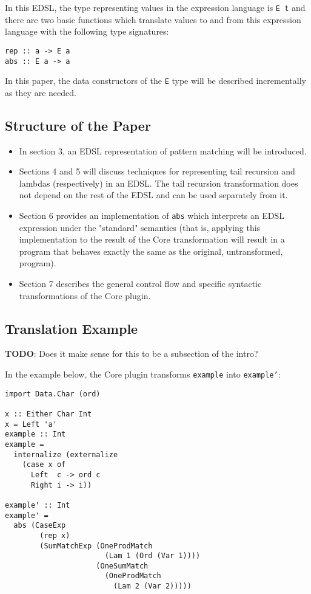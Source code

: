 \documentclass[sigplan,screen]{acmart}
\newcommand{\ttt}{\texttt}
\begin{document}
In this EDSL, the type representing values in the expression language is \ttt{E t}
and there are two basic functions which translate values to and from this
expression language with the following type signatures:

\begin{lstlisting}
rep :: a -> E a
abs :: E a -> a
\end{lstlisting}

In this paper, the data constructors of the \ttt{E} type will be described
incrementally as they are needed.

\subsection{Structure of the Paper}

\begin{itemize}
  \item In section 3, an EDSL representation of pattern matching will be
    introduced.
  \item Sections 4 and 5 will discuss techniques for representing tail recursion
    and lambdas (respectively) in an EDSL. The tail recursion transformation
    does not depend on the rest of the EDSL and can be used separately from it.
  \item Section 6 provides an implementation of \ttt{abs} which interprets an EDSL
    expression under the "standard" semantics (that is, applying this implementation
    to the result of the Core transformation will result in a program that behaves exactly
    the same as the original, untransformed, program).
  \item Section 7 describes the general control flow and specific syntactic
    transformations of the Core plugin.
\end{itemize}

\subsection{Translation Example} %
\begin{tcolorbox}
  \textbf{TODO}: Does it make sense for this to be a subsection of the intro?
\end{tcolorbox}

In the example below, the Core plugin transforms \ttt{example} into \ttt{example'}:
\begin{lstlisting}[deletekeywords={Ord}]
import Data.Char (ord)

x :: Either Char Int
x = Left 'a'
example :: Int
example =
  internalize (externalize
    (case x of
      Left  c -> ord c
      Right i -> i))

example' :: Int
example' =
  abs (CaseExp
        (rep x)
        (SumMatchExp (OneProdMatch
                       (Lam 1 (Ord (Var 1))))
                     (OneSumMatch
                       (OneProdMatch
                         (Lam 2 (Var 2)))))
\end{lstlisting}
\end{document}
